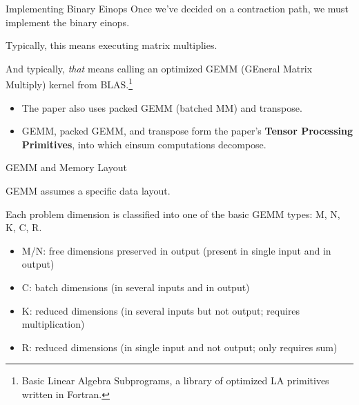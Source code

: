 \documentclass[aspectratio=169,10pt]{beamer}
\begin{document}
\begin{frame}{Implementing Binary Einops}
	Once we've decided on a contraction path, we must implement the binary einops.
	
	Typically, this means executing matrix multiplies.
	
	And typically, \emph{that} means calling an optimized GEMM (GEneral Matrix Multiply) kernel from BLAS.\footnote{Basic Linear Algebra Subprograms, a library of optimized LA primitives written in Fortran.}
	\begin{itemize}
		\item The paper also uses packed GEMM (batched MM) and transpose.
		\item GEMM, packed GEMM, and transpose form the paper's \textbf{Tensor Processing Primitives}, into which einsum computations decompose. 
	\end{itemize}
	
\end{frame}

\begin{frame}{GEMM and Memory Layout}

GEMM assumes a specific data layout.

Each problem dimension is classified into one of the basic GEMM types: M, N, K, C, R.
\begin{itemize}
	\item [$\circ$] M/N: free dimensions preserved in output (present in single input and in output)
	\item [$\circ$] C: batch dimensions (in several inputs and in output)
	\item [$\circ$] K: reduced dimensions (in several inputs but not output; requires multiplication)
	\item [$\circ$] R: reduced dimensions (in single input and not output; only requires sum)
\end{itemize}
\end{frame}
\end{document}
